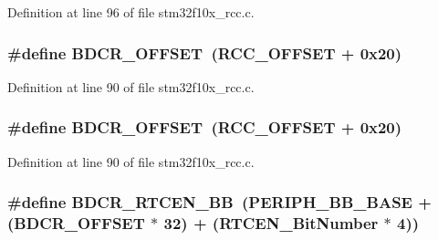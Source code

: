 Definition at line 96 of file stm32f10x\+\_\+rcc.\+c.

\subsubsection[{\texorpdfstring{B\+D\+C\+R\+\_\+\+O\+F\+F\+S\+ET}{BDCR_OFFSET}}]{\setlength{\rightskip}{0pt plus 5cm}\#define B\+D\+C\+R\+\_\+\+O\+F\+F\+S\+ET~({\bf R\+C\+C\+\_\+\+O\+F\+F\+S\+ET} + 0x20)}\hypertarget{group___r_c_c___private___defines_ga5f8a0c3cb5f5c835bf7eef09515138ad}{}\label{group___r_c_c___private___defines_ga5f8a0c3cb5f5c835bf7eef09515138ad}


Definition at line 90 of file stm32f10x\+\_\+rcc.\+c.

\subsubsection[{\texorpdfstring{B\+D\+C\+R\+\_\+\+O\+F\+F\+S\+ET}{BDCR_OFFSET}}]{\setlength{\rightskip}{0pt plus 5cm}\#define B\+D\+C\+R\+\_\+\+O\+F\+F\+S\+ET~({\bf R\+C\+C\+\_\+\+O\+F\+F\+S\+ET} + 0x20)}\hypertarget{group___r_c_c___private___defines_ga5f8a0c3cb5f5c835bf7eef09515138ad}{}\label{group___r_c_c___private___defines_ga5f8a0c3cb5f5c835bf7eef09515138ad}


Definition at line 90 of file stm32f10x\+\_\+rcc.\+c.

\subsubsection[{\texorpdfstring{B\+D\+C\+R\+\_\+\+R\+T\+C\+E\+N\+\_\+\+BB}{BDCR_RTCEN_BB}}]{\setlength{\rightskip}{0pt plus 5cm}\#define B\+D\+C\+R\+\_\+\+R\+T\+C\+E\+N\+\_\+\+BB~({\bf P\+E\+R\+I\+P\+H\+\_\+\+B\+B\+\_\+\+B\+A\+SE} + ({\bf B\+D\+C\+R\+\_\+\+O\+F\+F\+S\+ET} $\ast$ 32) + ({\bf R\+T\+C\+E\+N\+\_\+\+Bit\+Number} $\ast$ 4))}\hypertarget{group___r_c_c___private___defines_gaf70aaf70b0752ccb3a60307b2fb46038}{}\label{group___r_c_c___private___defines_gaf70aaf70b0752ccb3a60307b2fb46038}


